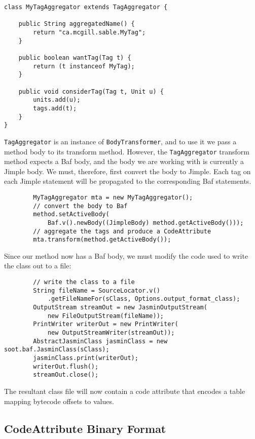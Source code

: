 \documentclass{article}
\begin{document}
\begin{verbatim}
class MyTagAggregator extends TagAggregator {

    public String aggregatedName() {
        return "ca.mcgill.sable.MyTag";
    }

    public boolean wantTag(Tag t) {
        return (t instanceof MyTag);
    }

    public void considerTag(Tag t, Unit u) {
        units.add(u);
        tags.add(t);
    }
}
\end{verbatim}

{\tt TagAggregator} is an instance of {\tt BodyTransformer}, and to use it we 
pass a method body to its transform method. However, the {\tt TagAggregator} 
transform method expects a Baf body, and the body we are working with is 
currently a Jimple body. We must, therefore, first convert the body to Jimple. 
Each tag on each Jimple statement will be propagated to the corresponding Baf 
statements.

\begin{verbatim}
        MyTagAggregator mta = new MyTagAggregator();
        // convert the body to Baf
        method.setActiveBody(
            Baf.v().newBody((JimpleBody) method.getActiveBody()));
        // aggregate the tags and produce a CodeAttribute
        mta.transform(method.getActiveBody());
\end{verbatim}

Since our method now has a Baf body, we must modify the code used to write the 
class out to a file:

\begin{verbatim}
        // write the class to a file
        String fileName = SourceLocator.v()
            .getFileNameFor(sClass, Options.output_format_class);
        OutputStream streamOut = new JasminOutputStream(
            new FileOutputStream(fileName));
        PrintWriter writerOut = new PrintWriter(
            new OutputStreamWriter(streamOut));
        AbstractJasminClass jasminClass = new soot.baf.JasminClass(sClass);
        jasminClass.print(writerOut);
        writerOut.flush();
        streamOut.close();
\end{verbatim}

The resultant class file will now contain a code attribute that encodes a table
mapping bytecode offsets to values.

\subsection{CodeAttribute Binary Format}
\end{document}
